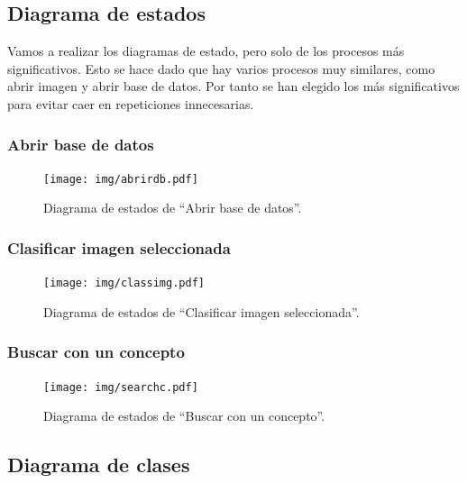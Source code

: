 \subsection{Diagrama de estados}

Vamos a realizar los diagramas de estado, pero solo de los procesos más significativos. Esto se hace dado que hay varios procesos muy similares, como abrir imagen y abrir base de datos. Por tanto se han elegido los más significativos para evitar caer en repeticiones innecesarias.

\subsubsection{Abrir base de datos}
\begin{figure}[H]
\begin{center}

\texttt{[image: img/abrirdb.pdf]}
\end{center}

\caption{Diagrama de estados de ``Abrir base de datos''.}
\label{abrirdb}
\end{figure}

\subsubsection{Clasificar imagen seleccionada}
\begin{figure}[H]
\begin{center}

\texttt{[image: img/classimg.pdf]}
\end{center}

\caption{Diagrama de estados de ``Clasificar imagen seleccionada''.}
\label{classimg}
\end{figure}

\subsubsection{Buscar con un concepto}
\begin{figure}[H]
\begin{center}

\texttt{[image: img/searchc.pdf]}
\end{center}

\caption{Diagrama de estados de ``Buscar con un concepto''.}
\label{searchc}
\end{figure}

\subsection{Diagrama de clases}

